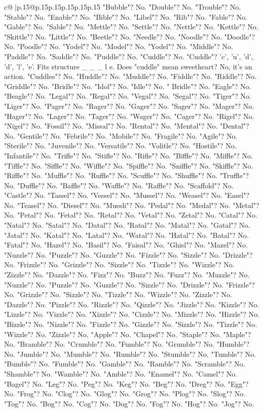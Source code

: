 \documentclass{article}
\begin{document}
{\begin{supertabular}{c@{$\;$}|p{.15\linewidth}@{}p{.15\linewidth}p{.15\linewidth}p{.15\linewidth}p{.15\linewidth}p{.15\linewidth}}
{{{"Bubble"? No. "Double"? No. "Trouble"? No. "Stable"? No. "Enable"? No. "Bible"? No. "Libel"? No. "Rib"? No. "Fable"? No. "Gable"? No. "Sable"? No. "Mettle"? No. "Settle"? No. "Nettle"? No. "Kettle"? No. "Skittle"? No. "Little"? No. "Beetle"? No. "Needle"? No. "Noodle"? No. "Doodle"? No. "Poodle"? No. "Yodel"? No. "Model"? No. "Yodel"? No. "Middle"? No. "Paddle"? No. "Saddle"? No. "Puddle"? No. "Cuddle"? No. "Cuddle"? 'c', 'u', 'd', 'd', 'l', 'e'. Fits structure \_ \_ \_ l e. Does "cuddle" mean sweetheart? No, it's an action. "Cuddles"? No. "Huddle"? No. "Muddle"? No. "Fiddle"? No. "Riddle"? No. "Griddle"? No. "Bridle"? No. "Idol"? No. "Idle"? No. " Bridle"? No. "Eagle"? No. "Beagle"? No. "Legal"? No. "Regal"? No. "Vegal"? No. "Segal"? No. "Tiger"? No. "Liger"? No. "Pager"? No. "Rager"? No. "Gager"? No. "Sager"? No. "Mager"? No. "Hager"? No. "Lager"? No. "Tager"? No. "Wager"? No. "Cager"? No. "Rigel"? No. "Nigel"? No. "Fossil"? No. "Missal"? No. "Rental"? No. "Mental"? No. "Dental"? No. "Gentile"? No. "Febrile"? No. "Mobile"? No. "Fragile"? No. "Agile"? No. "Sterile"? No. "Juvenile"? No. "Versatile"? No. "Volitle"? No. "Hostile"? No. "Infantile"? No. "Trifle"? No. "Stifle"? No. "Rifle"? No. "Biffle"? No. "Miffle"? No. "Tiffle"? No. "Siffle"? No. "Wiffle"? No. "Spiffle"? No. "Sniffle"? No. "Skiffle"? No. "Riffle"? No. "Muffle"? No. "Ruffle"? No. "Scuffle"? No. "Shuffle"? No. "Truffle"? No. "Duffle"? No. "Baffle"? No. "Waffle"? No. "Raffle"? No. "Scaffold"? No. "Castle"? No. "Tassel"? No. "Vessel"? No. "Mussel"? No. "Weasel"? No. "Easel"? No. "Teasel"? No. "Diesel"? No. "Muesli"? No. "Pedal"? No. "Medal"? No. "Metal"? No. "Petal"? No. "Fetal"? No. "Retal"? No. "Vetal"? No. "Zetal"? No. "Catal"? No. "Natal"? No. "Satal"? No. "Datal"? No. "Ratal"? No. "Matal"? No. "Gatal"? No. "Jatal"? No. "Katal"? No. "Latal"? No. "Watal"? No. "Hatal"? No. "Batal"? No. "Fatal"? No. "Hazel"? No. "Basil"? No. "Faisal"? No. "Ghisl"? No. "Mazel"? No. "Nuzzle"? No. "Puzzle"? No. "Guzzle"? No. "Fizzle"? No. "Sizzle"? No. "Drizzle"? No. "Frizzle"? No. "Grizzle"? No. "Sizzle"? No. "Tizzle"? No. "Wizzle"? No. "Zizzle"? No. "Dazzle"? No. "Fizz"? No. "Buzz"? No. "Fuzz"? No. "Muzzle"? No. "Nuzzle"? No. "Puzzle"? No. "Guzzle"? No. "Sizzle"? No. "Drizzle"? No. "Frizzle"? No. "Grizzle"? No. "Sizzle"? No. "Tizzle"? No. "Wizzle"? No. "Zizzle"? No. "Dazzle"? No. "Pizzle"? No. "Rizzle"? No. "Qizzle"? No. "Jizzle"? No. "Kizzle"? No. "Lizzle"? No. "Vizzle"? No. "Xizzle"? No. "Cizzle"? No. "Mizzle"? No. "Hizzle"? No. "Bizzle"? No. "Nizzle"? No. "Fizzle"? No. "Gizzle"? No. "Sizzle"? No. "Tizzle"? No. "Wizzle"? No. "Zizzle"? No. "Apple"? No. "Chapel"? No. "Staple"? No. "Maple"? No. "Bramble"? No. "Crumble"? No. "Fumble"? No. "Grumble"? No. "Humble"? No. "Jumble"? No. "Mumble"? No. "Rumble"? No. "Stumble"? No. "Tumble"? No. "Bumble"? No. "Fumble"? No. "Gamble"? No. "Ramble"? No. "Scramble"? No. "Shamble"? No. "Wamble"? No. "Amble"? No. "Enamel"? No. "Camel"? No. "Bagel"? No. "Leg"? No. "Peg"? No. "Keg"? No. "Beg"? No. "Dreg"? No. "Egg"? No. "Frog"? No. "Clog"? No. "Glog"? No. "Grog"? No. "Plog"? No. "Slog"? No. "Tog"? No. "Bog"? No. "Cog"? No. "Dog"? No. "Fog"? No. "Hog"? No. "Jog"? No. }}}
\end{supertabular}}
\end{document}
